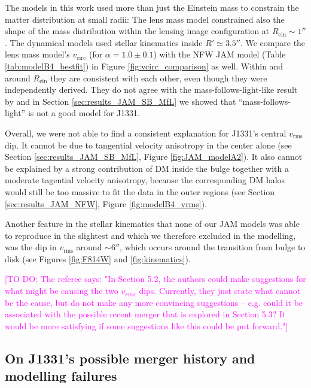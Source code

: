 \documentclass[useAMS,usenatbib]{mnras}
\newcommand{\Wilma}[1]{\textcolor{Magenta}{#1}}
\begin{document}
The models in this work used more than just the Einstein mass to constrain the matter distribution at small radii: The lens mass model constrained also the shape of the mass distribution within the lensing image configuration at $R_\text{ein} \sim 1''$. The dynamical models used stellar kinematics inside $R' \simeq 3.5''$. We compare the lens mass model's $v_\text{circ}$ (for $\alpha=1.0\pm 0.1$) with the NFW JAM model (Table \ref{tab:modelB4_bestfit}) in Figure \ref{fig:vcirc_comparison} as well. Within and around $R_\text{ein}$ they are consistent with each other, even though they were independently derived. They do not agree with the mass-follows-light-like result by \citet{SWELLSV} and in Section \ref{sec:results_JAM_SB_MfL} we showed that ``mass-follows-light'' is not a good model for J1331.

Overall, we were not able to find a consistent explanation for J1331's central $v_\text{rms}$ dip. It cannot be due to tangential velocity anisotropy in the center alone (see Section \ref{sec:results_JAM_SB_MfL}, Figure \ref{fig:JAM_modelA2}). It also cannot be explained by a strong contribution of DM inside the bulge together with a moderate tagential velocity anisotropy, because the corresponding DM halos would still be too massive to fit the data in the outer regions (see Section \ref{sec:results_JAM_NFW}, Figure \ref{fig:modelB4_vrms}).

Another feature in the stellar kinematics that none of our JAM models was able to reproduce in the slightest and which we therefore excluded in the modelling, was the dip in $v_\text{rms}$ around $\sim 6''$, which occurs around the transition from bulge to disk (see Figures \ref{fig:F814W} and \ref{fig:kinematics}).

\Wilma{[TO DO: The referee says: "In Section 5.2, the authors could make suggestions for what might be causing the two
$v_{rms}$ dips. Currently, they just state what cannot be the cause, but do not make any
more convincing suggestions – e.g. could it be associated with the possible recent
merger that is explored in Section 5.3? It would be more satisfying if some
suggestions like this could be put forward."]}

\subsection{On J1331's possible merger history and modelling failures}
\end{document}
